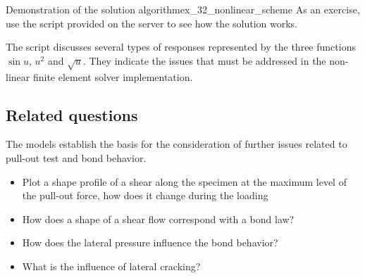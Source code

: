 \documentclass[main.tex]{subfiles}
\begin{document}
\begin{bmcsex}{Demonstration of the solution algorithm}{ex_32_nonlinear_scheme}
As an exercise, use the script provided on the server to 
see how the solution works.

The script discusses several types of responses represented by the three functions  $\sin{u}$, $u^2$ and $\sqrt{u}$. They indicate the issues that must be addressed in the non-linear finite element solver implementation.
\end{bmcsex}

\subsection{Related questions}
The models establish the basis for the consideration of further issues related to 
pull-out test and bond behavior.
\begin{itemize}
\item Plot a shape profile of a shear along the specimen at the maximum level of the pull-out force, how does it change during the loading
\item How does a shape of a shear flow correspond with a bond law?
\item How does the lateral pressure influence the bond behavior? 
\item What is the influence of lateral cracking?
\end{itemize}
\end{document}
